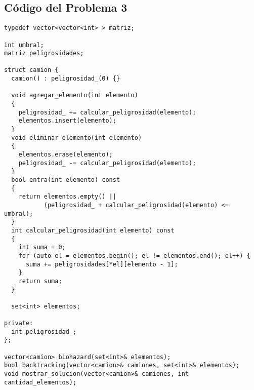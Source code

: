 \documentclass[a4paper]{article}
\begin{document}





\subsection{Código del Problema 3}



\vspace*{0.5cm}

\begin{lstlisting}
typedef vector<vector<int> > matriz;

int umbral;
matriz peligrosidades;

struct camion {
  camion() : peligrosidad_(0) {}

  void agregar_elemento(int elemento)
  {
    peligrosidad_ += calcular_peligrosidad(elemento);
    elementos.insert(elemento);
  }
  void eliminar_elemento(int elemento)
  {
    elementos.erase(elemento);
    peligrosidad_ -= calcular_peligrosidad(elemento);
  }
  bool entra(int elemento) const
  {
    return elementos.empty() ||
           (peligrosidad_ + calcular_peligrosidad(elemento) <= umbral);
  }
  int calcular_peligrosidad(int elemento) const
  {
    int suma = 0;
    for (auto el = elementos.begin(); el != elementos.end(); el++) {
      suma += peligrosidades[*el][elemento - 1];
    }
    return suma;
  }

  set<int> elementos;

private:
  int peligrosidad_;
};

vector<camion> biohazard(set<int>& elementos);
bool backtracking(vector<camion>& camiones, set<int>& elementos);
void mostrar_solucion(vector<camion>& camiones, int cantidad_elementos);
\end{lstlisting}
\end{document}
